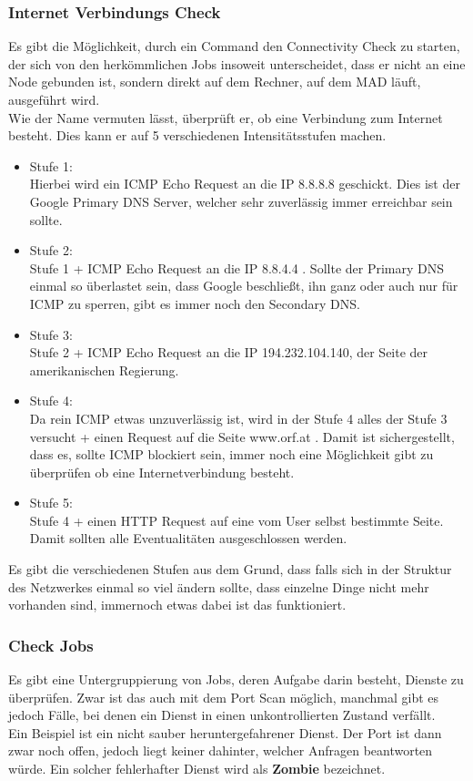 \documentclass[12pt,a4paper]{report}
\begin{document}
\begin{onehalfspace}
\subsubsection{Internet Verbindungs Check}
Es gibt die Möglichkeit, durch ein Command den Connectivity Check zu starten, der sich von den herkömmlichen Jobs insoweit unterscheidet, dass er nicht an eine Node gebunden ist, sondern direkt auf dem Rechner, auf dem MAD läuft, ausgeführt wird.\\
Wie der Name vermuten lässt, überprüft er, ob eine Verbindung zum Internet besteht. Dies kann er auf 5 verschiedenen Intensitätsstufen machen.\\
\begin{itemize}
\item Stufe 1:\\
Hierbei wird ein ICMP Echo Request an die IP 8.8.8.8 geschickt. Dies ist der Google Primary DNS Server, welcher sehr zuverlässig immer erreichbar sein sollte.
\item Stufe 2:\\
Stufe 1 + ICMP Echo Request an die IP 8.8.4.4 . Sollte der Primary DNS einmal so überlastet sein, dass Google beschließt, ihn ganz oder auch nur für ICMP zu sperren, gibt es immer noch den Secondary DNS.
\item Stufe 3:\\
Stufe 2 + ICMP Echo Request an die IP 194.232.104.140, der Seite der amerikanischen Regierung. 
\item Stufe 4:\\
Da rein ICMP etwas unzuverlässig ist, wird in der Stufe 4 alles der Stufe 3 versucht + einen Request auf die Seite www.orf.at . Damit ist sichergestellt, dass es, sollte ICMP blockiert sein, immer noch eine Möglichkeit gibt zu überprüfen ob eine Internetverbindung besteht.
\item Stufe 5:\\
Stufe 4 + einen HTTP Request auf eine vom User selbst bestimmte Seite. Damit sollten alle Eventualitäten ausgeschlossen werden. 
\end{itemize}

Es gibt die verschiedenen Stufen aus dem Grund, dass falls sich in der Struktur des Netzwerkes einmal so viel ändern sollte, dass einzelne Dinge nicht mehr vorhanden sind, immernoch etwas dabei ist das funktioniert.

\subsubsection{Check Jobs}
Es gibt eine Untergruppierung von Jobs, deren Aufgabe darin besteht, Dienste zu überprüfen. Zwar ist das auch mit dem Port Scan möglich, manchmal gibt es jedoch Fälle, bei denen ein Dienst in einen unkontrollierten Zustand verfällt.\\
Ein Beispiel ist ein nicht sauber heruntergefahrener Dienst. Der Port ist dann zwar noch offen, jedoch liegt keiner dahinter, welcher Anfragen beantworten würde. Ein solcher fehlerhafter Dienst wird als \textbf{Zombie} bezeichnet.\\


\end{onehalfspace}
\end{document}
